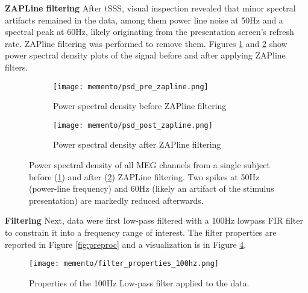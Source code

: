 \textbf{ZAPLine filtering} After \gls{tSSS}, visual inspection revealed that minor spectral artifacts remained in the data, among them power line noise at 50Hz and a spectral peak at 60Hz, likely originating from the presentation screen's refresh rate.
ZAPline filtering \citep{de2020zapline} was performed to remove them.
Figures \ref{fig:prezap} and \ref{fig:postzap} show power spectral density plots of the signal before and after applying ZAPline filters.


\begin{figure}
	\begin{subfigure}{.49\textwidth}
		\texttt{[image: memento/psd\_pre\_zapline.png]}
		\caption{Power spectral density before ZAPline filtering}
		\label{fig:prezap}
	\end{subfigure}
	\begin{subfigure}{.49\textwidth}
		\texttt{[image: memento/psd\_post\_zapline.png]}
		\caption{Power spectral density after ZAPline filtering}
		\label{fig:postzap}
	\end{subfigure}
	\caption[Power spectral density before and after ZAPLine filtering]{Power spectral density of all MEG channels
		from a single subject before (\ref{fig:prezap}) and after (\ref{fig:postzap}) ZAPLine filtering.
		Two spikes at 50Hz (power-line frequency) and 60Hz (likely an artifact of the stimulus presentation) are markedly reduced afterwards.
	}
	\label{fig:zapline_psd}
\end{figure}

\textbf{Filtering} Next, data were first low-pass filtered with a 100Hz lowpass FIR filter to constrain it into a frequency range of interest.
The filter properties are reported in Figure \ref{fig:preproc} and a visualization is in Figure \ref{fig:filter}.

\begin{figure}
	\centering
	\texttt{[image: memento/filter\_properties\_100hz.png]}
	\caption[Lowpass filter properties]{Properties of the 100Hz Low-pass filter applied to the data.}
	\label{fig:filter}
\end{figure}


